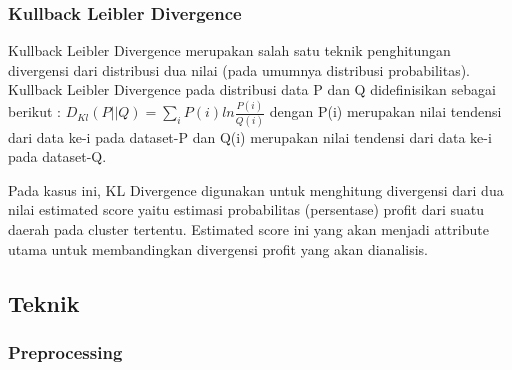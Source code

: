 \documentclass{article}
\begin{document}
\subsubsection{Kullback Leibler Divergence}
\begin{adjustwidth}{4em}{0pt}
\hspace{\parindent}Kullback Leibler Divergence merupakan salah satu teknik penghitungan divergensi dari distribusi dua nilai (pada umumnya distribusi probabilitas). Kullback Leibler Divergence pada distribusi data  P dan Q  didefinisikan sebagai berikut :
$D_{Kl}(P||Q) = \sum\limits_{i}P(i)ln\frac{P(i)}{Q(i)}$
dengan P(i) merupakan nilai tendensi dari data ke-i pada dataset-P dan Q(i) merupakan nilai tendensi dari data ke-i pada dataset-Q.

Pada kasus ini, KL Divergence digunakan untuk menghitung divergensi dari dua nilai estimated score yaitu estimasi probabilitas (persentase) profit dari suatu daerah pada cluster tertentu. Estimated score ini  yang akan menjadi attribute utama untuk membandingkan divergensi profit yang akan dianalisis.

\end{adjustwidth}

\subsection{Teknik}

\subsubsection{Preprocessing}
\end{document}

